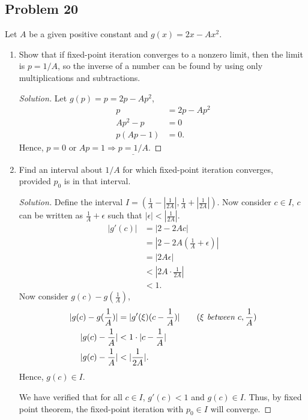 \documentclass{article}
\begin{document}
\subsection*{Problem 20}
Let $A$ be a given positive constant and $g(x)=2x-Ax^2$.
\begin{enumerate}[label=\alph*.]
    \item Show that if fixed-point iteration converges to a nonzero limit, then the limit is 
    $p=1/A$, so the inverse of a number can be found by using only multiplications and subtractions.
    \begin{proof}[Solution]
        Let $g(p) = p = 2p-Ap^2$,
        \begin{align*}
            p & = 2p - Ap^2 \\
            Ap^2 - p & = 0 \\
            p(Ap-1) & = 0.
        \end{align*}
        Hence, $p=0$ or $Ap=1\Rightarrow \underline{p = 1/A}$.
    \end{proof}
    \item Find an interval about $1/A$ for which fixed-point iteration converges, provided $p_0$ is 
    in that interval.
    \begin{proof}[Solution]
        Define the interval $I = (\frac{1}{A}-|\frac{1}{2A}|, \frac{1}{A}+|\frac{1}{2A}|)$. Now 
        consider $c \in I$, $c$ can be written as  $\frac{1}{A} + \epsilon$ such that 
        $|\epsilon|<|\frac{1}{2A}|$. 
        \begin{align*}
            |g'(c)| & = |2 - 2Ac| \\
            & = |2-2A\left(\frac{1}{A}+\epsilon\right)| \\
            & = |2A\epsilon| \\
            & < |2A\cdot\frac{1}{2A}| \\
            & < 1.
        \end{align*}
        Now consider $g(c) - g(\frac{1}{A})$,
        \begin{align*}
            |g(c) - g(\frac{1}{A})| & = |g'(\xi)(c-\frac{1}{A})| \qquad (\xi \emph{ between }
            c, \frac{1}{A})\\
            |g(c) -\frac{1}{A}| & < 1 \cdot |c - \frac{1}{A}| \\
            |g(c) -\frac{1}{A}| & < |\frac{1}{2A}|.
        \end{align*}
        Hence, $g(c)\in I$.
        
        We have verified that for all $c\in I$, $g'(c)<1$ and $g(c)\in I$. Thus, by fixed point 
        theorem, the fixed-point iteration with $p_0 \in I$ will converge.
    \end{proof}
\end{enumerate}
\end{document}
